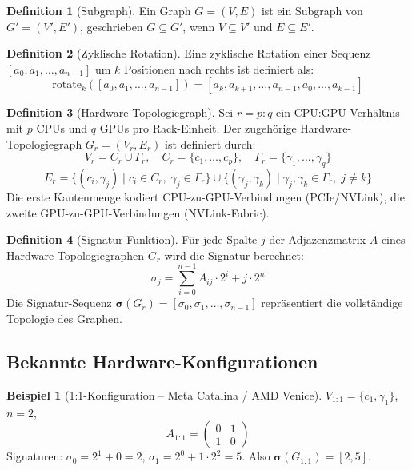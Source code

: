 ﻿\documentclass[a4paper,12pt]{article}
\theoremstyle{definition}
\newtheorem{definition}{Definition}
\newtheorem{beispiel}{Beispiel}
\begin{document}
\begin{definition}[Subgraph]
  Ein Graph $G = (V, E)$ ist ein Subgraph von $G' = (V', E')$,
  geschrieben $G \subseteq G'$, wenn $V \subseteq V'$ und $E \subseteq E'$.
\end{definition}

\begin{definition}[Zyklische Rotation]
  Eine zyklische Rotation einer Sequenz $[a_0, a_1, \ldots, a_{n-1}]$ um $k$
  Positionen nach rechts ist definiert als:
  \[
    \mathrm{rotate}_k([a_0, a_1, \ldots, a_{n-1}])
    = [a_k, a_{k+1}, \ldots, a_{n-1}, a_0, \ldots, a_{k-1}]
  \]
\end{definition}

\begin{definition}[Hardware-Topologiegraph]
  \label{def:htg}
  Sei $r = p:q$ ein CPU:GPU-Verh\"altnis mit $p$ CPUs und $q$ GPUs pro
  Rack-Einheit. Der zugeh\"orige Hardware-Topologiegraph $G_r = (V_r, E_r)$ ist
  definiert durch:
  \[
    V_r = C_r \cup \Gamma_r, \quad
    C_r = \{c_1, \ldots, c_p\}, \quad
    \Gamma_r = \{\gamma_1, \ldots, \gamma_q\}
  \]
  \[
    E_r = \{(c_i, \gamma_j) \mid c_i \in C_r,\; \gamma_j \in \Gamma_r\}
    \cup \{(\gamma_j, \gamma_k) \mid \gamma_j, \gamma_k \in \Gamma_r,\; j \neq k\}
  \]
  Die erste Kantenmenge kodiert CPU-zu-GPU-Verbindungen (PCIe/NVLink),
  die zweite GPU-zu-GPU-Verbindungen (NVLink-Fabric).
\end{definition}

\begin{definition}[Signatur-Funktion]
  F\"ur jede Spalte $j$ der Adjazenzmatrix $A$ eines Hardware-Topologiegraphen
  $G_r$ wird die Signatur berechnet:
  \[
    \sigma_j = \sum_{i=0}^{n-1} A_{ij} \cdot 2^i + j \cdot 2^n
  \]
  Die Signatur-Sequenz $\boldsymbol{\sigma}(G_r) = [\sigma_0, \sigma_1, \ldots, \sigma_{n-1}]$
  repr\"asentiert die vollst\"andige Topologie des Graphen.
\end{definition}

\subsection{Bekannte Hardware-Konfigurationen}

\begin{beispiel}[1:1-Konfiguration -- Meta Catalina / AMD Venice]
  \label{ex:11}
  $V_{1:1} = \{c_1, \gamma_1\}$, $n = 2$,
  \[
    A_{1:1} = \begin{pmatrix} 0 & 1 \\ 1 & 0 \end{pmatrix}
  \]
  Signaturen: $\sigma_0 = 2^1 + 0 = 2$, $\sigma_1 = 2^0 + 1\cdot 2^2 = 5$.
  Also $\boldsymbol{\sigma}(G_{1:1}) = [2, 5]$.
\end{beispiel}
\end{document}
